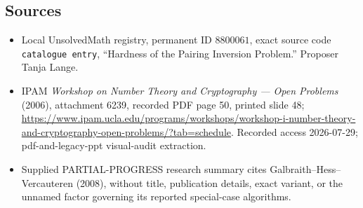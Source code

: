 \documentclass[11pt]{article}
\begin{document}
\subsection{Sources}
\begin{itemize}
\item Local UnsolvedMath registry, permanent ID \(8800061\), exact source code \texttt{catalogue entry}, ``Hardness of the Pairing Inversion Problem.'' Proposer Tanja Lange.
\item IPAM \emph{Workshop on Number Theory and Cryptography --- Open Problems} (2006), attachment 6239, recorded PDF page 50, printed slide 48; \url{https://www.ipam.ucla.edu/programs/workshops/workshop-i-number-theory-and-cryptography-open-problems/?tab=schedule}. Recorded access 2026-07-29; pdf-and-legacy-ppt visual-audit extraction.
\item Supplied PARTIAL-PROGRESS research summary cites Galbraith--Hess--Vercauteren (2008), without title, publication details, exact variant, or the unnamed factor governing its reported special-case algorithms.
\end{itemize}
\end{document}
